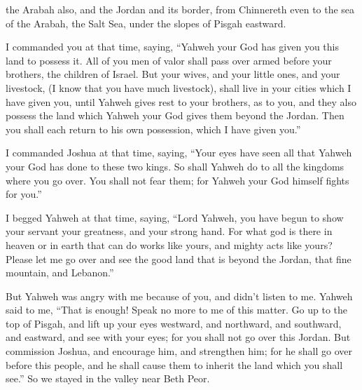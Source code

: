 {the Arabah also, and the Jordan and its border, from Chinnereth even to the sea of the Arabah, the Salt Sea, under the slopes of Pisgah eastward.
\par }{\PP {}I commanded you at that time, saying, “Yahweh your God has given you this land to possess it. All of you men of valor shall pass over armed before your brothers, the children of Israel.
But your wives, and your little ones, and your livestock, (I know that you have much livestock), shall live in your cities which I have given you,
until Yahweh gives rest to your brothers, as to you, and they also possess the land which Yahweh your God gives them beyond the Jordan. Then you shall each return to his own possession, which I have given you.”
\par }{\PP {}I commanded Joshua at that time, saying, “Your eyes have seen all that Yahweh your God has done to these two kings. So shall Yahweh do to all the kingdoms where you go over.
You shall not fear them; for Yahweh your God himself fights for you.”
\par }{\PP {}I begged Yahweh at that time, saying,
“Lord Yahweh, you have begun to show your servant your greatness, and your strong hand. For what god is there in heaven or in earth that can do works like yours, and mighty acts like yours?
Please let me go over and see the good land that is beyond the Jordan, that fine mountain, and Lebanon.”
\par }{\PP {}But Yahweh was angry with me because of you, and didn’t listen to me. Yahweh said to me, “That is enough! Speak no more to me of this matter.
Go up to the top of Pisgah, and lift up your eyes westward, and northward, and southward, and eastward, and see with your eyes; for you shall not go over this Jordan.
But commission Joshua, and encourage him, and strengthen him; for he shall go over before this people, and he shall cause them to inherit the land which you shall see.”
So we stayed in the valley near Beth Peor.

}
